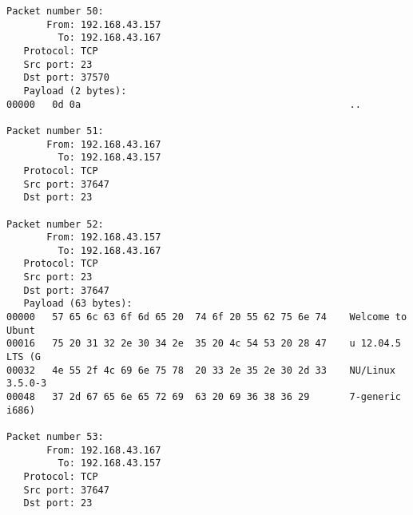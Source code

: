 \documentclass[a4paper,12pt]{article}
\begin{document}
\begin{verbatim}
Packet number 50:
       From: 192.168.43.157
         To: 192.168.43.167
   Protocol: TCP
   Src port: 23
   Dst port: 37570
   Payload (2 bytes):
00000   0d 0a                                               ..

Packet number 51:
       From: 192.168.43.167
         To: 192.168.43.157
   Protocol: TCP
   Src port: 37647
   Dst port: 23

Packet number 52:
       From: 192.168.43.157
         To: 192.168.43.167
   Protocol: TCP
   Src port: 23
   Dst port: 37647
   Payload (63 bytes):
00000   57 65 6c 63 6f 6d 65 20  74 6f 20 55 62 75 6e 74    Welcome to Ubunt
00016   75 20 31 32 2e 30 34 2e  35 20 4c 54 53 20 28 47    u 12.04.5 LTS (G
00032   4e 55 2f 4c 69 6e 75 78  20 33 2e 35 2e 30 2d 33    NU/Linux 3.5.0-3
00048   37 2d 67 65 6e 65 72 69  63 20 69 36 38 36 29       7-generic i686)

Packet number 53:
       From: 192.168.43.167
         To: 192.168.43.157
   Protocol: TCP
   Src port: 37647
   Dst port: 23


\end{verbatim}
\end{document}
